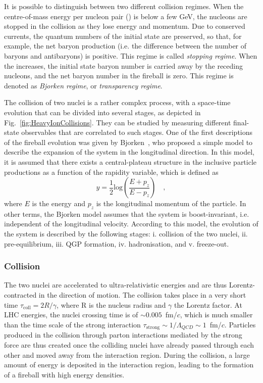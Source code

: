 It is possible to distinguish between two different collision regimes. When the centre-of-mass energy per nucleon pair (\snn) is below a few GeV, the nucleons are stopped in the collision as they lose energy and momentum. Due to conserved currents, the quantum numbers of the initial state are preserved, so that, for example, the net baryon production (i.e. the difference between the number of baryons and antibaryons) is positive. This regime is called \emph{stopping regime}. When the \snn increases, the initial state baryon number is carried away by the receding nucleons, and the net baryon number in the fireball is zero. This regime is denoted as \emph{Bjorken regime}, or \emph{transparency regime}. 

The collision of two nuclei is a rather complex process, with a space-time evolution that can be divided into several stages, as depicted in Fig.~\ref{fig:HeavyIonCollisions}. They can be studied by measuring different final-state observables that are correlated to such stages. One of the first descriptions of the fireball evolution was given by Bjorken~\cite{Bjorken:1982qr}, who proposed a simple model to describe the expansion of the system in the longitudinal direction. In this model, it is assumed that there exists a central-plateau structure in the inclusive particle productions as a function of the rapidity variable, which is defined as 
\begin{equation*}
    y = \frac{1}{2}\mathrm{log}\left(\frac{E+p_z}{E-p_z}\right)\quad ,
\end{equation*}
where $E$ is the energy and $p_z$ is the longitudinal momentum of the particle. In other terms, the Bjorken model assumes that the system is boost-invariant, i.e. independent of the longitudinal velocity. According to this model, the evolution of the system is described by the following stages: i. collision of the two nuclei, ii. pre-equilibrium, iii. QGP formation, iv. hadronisation, and v. freeze-out.

\subsubsection{Collision}
The two nuclei are accelerated to ultra-relativistic energies and are thus Lorentz-contracted in the direction of motion. The collision takes place in a very short time $\tau_\mathrm{coll} = 2R/\gamma$, where R is the nucleus radius and $\gamma$ the Lorentz factor. At LHC energies, the nuclei crossing time is of $\sim 0.005$~fm/$c$, which is much smaller than the time scale of the strong interaction $\tau_\mathrm{strong} \sim 1/\Lambda_{QCD} \sim 1$~fm/$c$. Particles produced in the collision through parton interactions mediated by the strong force are thus created once the colliding nuclei have already passed through each other and moved away from the interaction region. During the collision, a large amount of energy is deposited in the interaction region, leading to the formation of a fireball with high energy densities.

